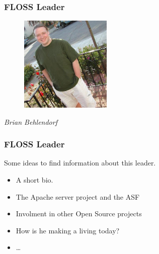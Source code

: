 \documentclass{beamer}
\begin{document}
\begin{frame}
\frametitle{FLOSS Leader}

\begin{figure}[h]
\begin{center}
  \includegraphics[height=1.80in]{figs/Brian_Behlendorf.jpg}
\end{center}
\end{figure}

\pause

\begin{center}
{\it Brian Behlendorf}
\end{center}

\end{frame}

\begin{frame}
\frametitle{FLOSS Leader}

Some ideas to find information about this leader.
\pause
\begin{itemize}
\item A short bio.
\item The Apache server project and the ASF
\item Involment in other Open Source projects 
\item How is he making a living today?
\item \ldots
\end{itemize}

\end{frame}


\end{document}
